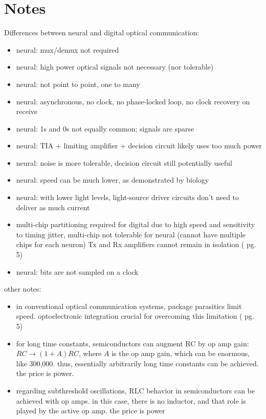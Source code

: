 \documentclass[twocolumn]{article}
\begin{document}

\section{Notes}
Differences between neural and digital optical communication:
\begin{itemize}
\item neural: mux/demux not required
\item neural: high power optical signals not necessary (nor tolerable)
\item neural: not point to point, one to many
\item neural: asynchronous, no clock, no phase-locked loop, no clock recovery on receive
\item neural: 1s and 0s not equally common; signals are sparse
\item neural: TIA + limiting amplifier + decision circuit likely uses too much power
\item neural: noise is more tolerable, decision circuit still potentially useful
\item neural: speed can be much lower, as demonstrated by biology
\item neural: with lower light levels, light-source driver circuits don't need to deliver as much current
\item multi-chip partitioning required for digital due to high speed and sensitivity to timing jitter, multi-chip not tolerable for neural (cannot have multiple chips for each neuron) Tx and Rx amplifiers cannot remain in isolation (\cite{ra2012} pg. 5)
\item neural: bits are not sampled on a clock
\end{itemize}

other notes:
\begin{itemize}
\item in conventional optical communication systems, package parasitics limit speed. optoelectronic integration crucial for overcoming this limitation (\cite{ra2012} pg. 5)
\item for long time constants, semiconductors can augment RC by op amp gain: $RC \rightarrow (1+A)RC$, where $A$ is the op amp gain, which can be enormous, like 300,000. thus, essentially arbitrarily long time constants can be achieved. the price is power.
\item regarding subthreshold oscillations, RLC behavior in semiconductors can be achieved with op amps. in this case, there is no inductor, and that role is played by the active op amp. the price is power
\end{itemize}
\end{document}
